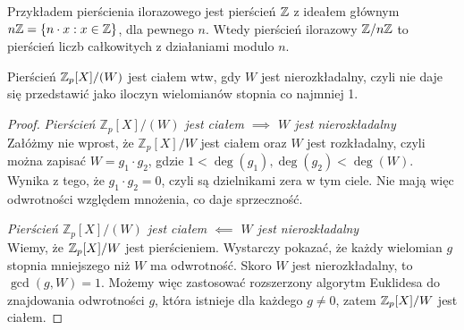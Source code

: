 Przykładem pierścienia ilorazowego jest pierścień \( \mathbb{Z} \) z ideałem głównym \( n \integer = \set{n \cdot x : x \in \integer} \), dla pewnego \( n \).
Wtedy pierścień ilorazowy \( \mathbb{Z} / n\mathbb{Z} \) to pierścień liczb całkowitych z działaniami modulo \( n \).
\begin{theorem}
Pierścień \( \mathbb{Z}_p[X]/(W) \) jest ciałem wtw, gdy \( W \) jest nierozkładalny, czyli nie daje się przedstawić jako iloczyn wielomianów stopnia co najmniej 1.
\end{theorem}
\begin{proof}
    \textit{Pierścień \( \mathbb{Z}_p[X]/(W) \) jest ciałem \( \implies \) \( W \) jest nierozkładalny} \\
    Załóżmy nie wprost, że \( \mathbb{Z}_p[X]/W \) jest ciałem oraz \( W \) jest rozkładalny, czyli można zapisać \linebreak \( W = g_1 \cdot g_2 \), gdzie \( 1 < \deg(g_1), \deg(g_2) < \deg(W) \).
    Wynika z tego, że \( g_1 \cdot g_2 = 0 \), czyli są dzielnikami zera w tym ciele. Nie mają więc odwrotności względem mnożenia, co daje sprzeczność.

    \textit{Pierścień \( \mathbb{Z}_p[X]/(W) \) jest ciałem \( \impliedby \) \( W \) jest nierozkładalny} \\
    Wiemy, że \( \mathbb{Z}_p[X]/W \) jest pierścieniem. Wystarczy pokazać, że każdy wielomian \( g \) stopnia mniejszego niż \( W \) ma odwrotność.
    Skoro \( W \) jest nierozkładalny, to \( \gcd(g, W) = 1 \). Możemy więc zastosować rozszerzony algorytm Euklidesa do znajdowania odwrotności \( g \), która istnieje dla każdego \( g \neq 0 \), zatem \( \mathbb{Z}_p[X]/W \) jest ciałem.
\end{proof}